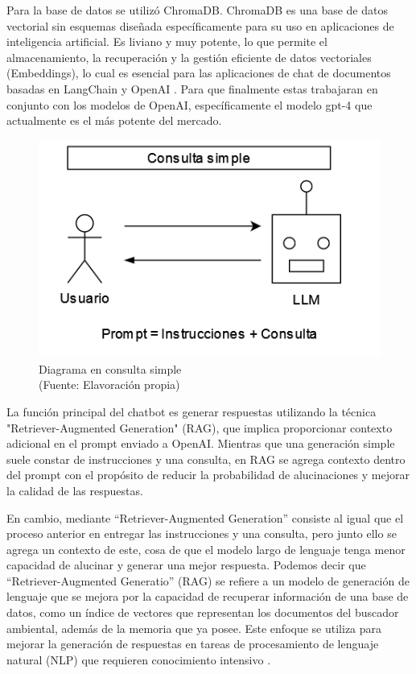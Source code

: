 Para la base de datos se utilizó ChromaDB. ChromaDB es una base de datos vectorial sin esquemas diseñada específicamente para 
su uso en aplicaciones de inteligencia artificial. Es liviano y muy potente, lo que permite el almacenamiento, la recuperación 
y la gestión eficiente de datos vectoriales (Embeddings), lo cual es esencial para las aplicaciones de chat de documentos 
basadas en LangChain y OpenAI \cite{langchain1}. Para que finalmente estas trabajaran en conjunto con los modelos de OpenAI, 
específicamente el modelo gpt-4 que actualmente es el más potente del mercado.

\begin{figure}[ht!]
    \centering
    \includegraphics[width=.4\textwidth]{figures/huemul6.png}
    \caption[Diagrama en consulta simple]{Diagrama en consulta simple\\
    {\scriptsize (Fuente: Elavoración propia)}}
    \label{fig:chatbot1}
\end{figure}


La función principal del chatbot es generar respuestas utilizando la técnica "Retriever-Augmented Generation" (RAG), 
que implica proporcionar contexto adicional en el prompt enviado a OpenAI. Mientras que una generación simple suele 
constar de instrucciones y una consulta, en RAG se agrega contexto dentro del prompt con el propósito de reducir la 
probabilidad de alucinaciones y mejorar la calidad de las respuestas. 


En cambio, mediante ``Retriever-Augmented Generation'' 
consiste al igual que el proceso anterior en entregar las instrucciones y una consulta, pero junto ello se agrega un contexto 
de este, cosa de que el modelo largo de lenguaje tenga menor capacidad de alucinar y generar una mejor respuesta. Podemos decir
que ``Retriever-Augmented Generatio'' (RAG) se refiere a un modelo de generación de lenguaje que se mejora por la capacidad 
de recuperar información de una base de datos, como un índice de vectores que representan los documentos del buscador ambiental, 
además de la memoria que ya posee. Este enfoque se utiliza para mejorar la generación de respuestas en tareas de procesamiento 
de lenguaje natural (NLP) que requieren conocimiento intensivo \cite{raq}.

